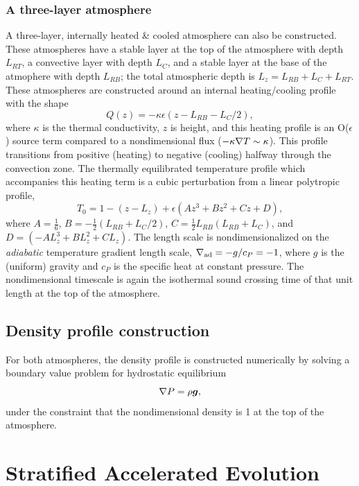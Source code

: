 \subsubsection{A three-layer atmosphere}
A three-layer, internally heated \& cooled atmosphere can also be constructed.
These atmospheres have a stable layer at the top of the atmosphere with depth $L_{RT}$, a convective layer with depth $L_C$, and a stable layer at the base of the atmophere with depth $L_{RB}$; the total atmospheric depth is $L_z = L_{RB} + L_C + L_{RT}$.
These atmospheres are constructed around an internal heating/cooling profile with the shape
\begin{equation}
Q(z) = -\kappa \epsilon(z - L_{RB} - L_C/2),
\end{equation}
where $\kappa$ is the thermal conductivity, $z$ is height, and this heating profile is an O($\epsilon$) source term compared to a nondimensional flux ($-\kappa\nabla T \sim \kappa$).
This profile transitions from positive (heating) to negative (cooling) halfway through the convection zone.
The thermally equilibrated temperature profile which accompanies this heating term is a cubic perturbation from a linear polytropic profile,
\begin{equation}
T_0 = 1 - (z - L_z) + \epsilon(A z^3 + B z^2 + Cz + D),
\end{equation}
where $A = \frac{1}{6}$, $B = -\frac{1}{2}(L_{RB} + L_C/2)$, $C = \frac{1}{2}L_{RB}(L_{RB} + L_C)$, and $D = (-AL_z^3 + BL_z^2 + CL_z)$.
The length scale is nondimensionalized on the \emph{adiabatic} temperature gradient length scale, $\nabla_{\text{ad}} = -g/c_P = -1$, where $g$ is the (uniform) gravity and $c_P$ is the specific heat at constant pressure.
The nondimensional timescale is again the isothermal sound crossing time of that unit length at the top of the atmosphere.

\subsection{Density profile construction}
For both atmospheres, the density profile is constructed numerically by solving a boundary value problem for hydrostatic equilibrium
\begin{equation}
\nabla P = \rho \bm{g},
\end{equation}
under the constraint that the nondimensional density is 1 at the top of the atmosphere.


\section{Stratified Accelerated Evolution}


